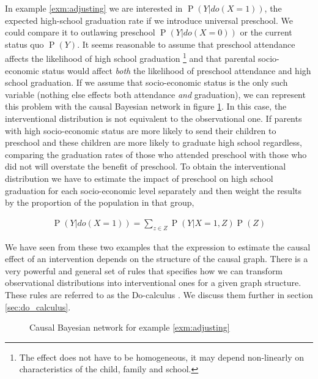 \documentclass[11pt,a4paper,oneside]{book}
\newcommand{\eqn}[1]{\begin{align}#1\end{align}}
\renewcommand{\P}[1]{\operatorname{P}\left(#1\right)}
\theoremstyle{plain}
\theoremstyle{definition}
\begin{document}
In example \ref{exm:adjusting} we are interested in $\P{Y|do(X=1)}$, the expected high-school graduation rate if we introduce universal preschool. We could compare it to outlawing preschool $\P{Y|do(X=0)}$ or the current status quo $\P{Y}$. It seems reasonable to assume that preschool attendance affects the likelihood of high school graduation \footnote{The effect does not have to be homogeneous, it may depend non-linearly on characteristics of the child, family and school.} and that parental socio-economic status would affect \emph{both} the likelihood of preschool attendance and high school graduation. If we assume that socio-economic status is the only such variable (nothing else effects both attendance \emph{and} graduation), we can represent this problem with the causal Bayesian network in figure \ref{fig:causal_adjust}. In this case, the interventional distribution is not equivalent to the observational one. If parents with high socio-economic status are more likely to send their children to preschool and these children are more likely to graduate high school regardless, comparing the graduation rates of those who attended preschool with those who did not will overstate the benefit of preschool. To obtain the interventional distribution we have to estimate the impact of preschool on high school graduation for each socio-economic level separately and then weight the results by the proportion of the population in that group,

\eqn{
\label{eqn:backdoor_example}
\P{Y|do(X=1)} = \sum_{z \in Z}\P{Y|X=1,Z}\P{Z}
} 

We have seen from these two examples that the expression to estimate the causal effect of an intervention depends on the structure of the causal graph. There is a very powerful and general set of rules that specifies how we can transform observational distributions into interventional ones for a given graph structure. These rules are referred to as the Do-calculus \citep{Pearl2000}. We discuss them further in section \ref{sec:do_calculus}. 


\begin{figure}
\center
{}
\caption{Causal Bayesian network for example \ref{exm:adjusting}}
\label{fig:causal_adjust} 
\end{figure}
\end{document}
